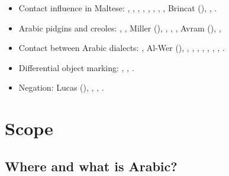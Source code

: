 \documentclass[output=paper]{langsci/langscibook}
\begin{document}
\begin{itemize}[noitemsep,leftmargin=11pt]
\item[\adfhalfrightarrowhead]Contact influence in Maltese: \citet{colin1957}, \citet{Aquilina1958}, \citet{krier1976}, \citet{Drewes1994}, \citet{mifsudloanverbs}, \citet{stolz2003}, \citet{vella2003}, \citet{bovingdondalli2006}, Brincat (\citeyear{brincat1996,brincat2011}), \citet{comriespagnol2016},  \citet{Souag2018berber}.

\item[\adfhalfrightarrowhead]Arabic pidgins and creoles: \citet{Owens1985}, \citet{BurengVincent1986}, Miller (\citeyear{Miller1989,Miller1993}), \citet{Nakao2012}, \citet{Luffin2014}, \citet{Manfredi2014relex}, Avram (\citeyear{Avram2017article,Avram2019}), \citet{Bizri2018}, \citet{Owens2018}

\item[\adfhalfrightarrowhead]Contact between Arabic dialects: \citet{Behnstedt1994Dialektkontakt}, Al-Wer (\citeyear{Al-Wer2002furtherreading,Al-Wer2007,Al-Wer2014}), \citet{Gibson2002}, \citet{Miller2007}, \citet{Al-Essa2009}, \citet{Palva2009}, \citet{Vicente2010}, \citet{Alghamdi2014}, \citet{CotterHoresh2015}, \citet{Leddy-Cecere2018}.

\item[\adfhalfrightarrowhead]Differential object marking: \citet{Coghill2014}, \citet{dohla2016}, \citet{Souag2017clitic}.

\item[\adfhalfrightarrowhead]Negation: Lucas (\citeyear{Lucas2007,Lucas2012,Lucas2013}), \citet{Souag2009}, \citet{LucasLash2010}, \citet{BreitbarthWillisLucasinpress}.

\end{itemize}

\section{Scope}

\subsection{Where and what is Arabic?}\label{introwerewhat}
\end{document}
